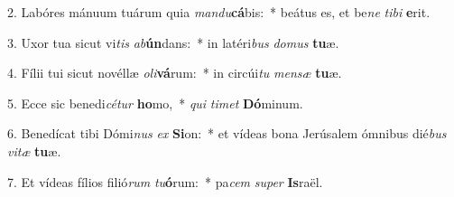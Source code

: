2. Labóres mánuum tuárum quia \textit{man}\textit{du}\textbf{cá}bis:~*  beátus es, et be\textit{ne} \textit{ti}\textit{bi} \textbf{e}rit.\

3. Uxor tua sicut vi\textit{tis} \textit{ab}\textbf{ún}dans:~*  in latéri\textit{bus} \textit{do}\textit{mus} \textbf{tu}æ.\

4. Fílii tui sicut novéllæ \textit{o}\textit{li}\textbf{vá}rum:~*  in circúi\textit{tu} \textit{men}\textit{sæ} \textbf{tu}æ.\

5. Ecce sic benedi\textit{cé}\textit{tur} \textbf{ho}mo,~*  \textit{qui} \textit{ti}\textit{met} \textbf{Dó}minum.\

6. Benedícat tibi Dómi\textit{nus} \textit{ex} \textbf{Si}on:~*  et vídeas bona Jerúsalem ómnibus dié\textit{bus} \textit{vi}\textit{tæ} \textbf{tu}æ.\

7. Et vídeas fílios filió\textit{rum} \textit{tu}\textbf{ó}rum:~*  pa\textit{cem} \textit{su}\textit{per} \textbf{Is}raël.\

